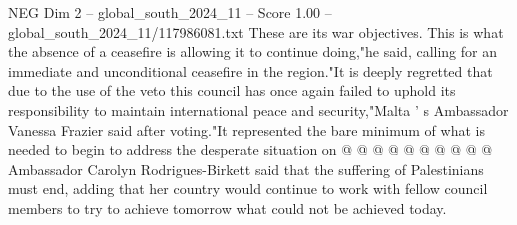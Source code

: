 \begin{textsample}{NEG Dim 2 – global\_south\_2024\_11 – Score 1.00 – global\_south\_2024\_11/117986081.txt}
These are its war objectives.
This is what the absence of a ceasefire is allowing it to continue doing,"he said, calling for an immediate and unconditional ceasefire in the region."It is deeply regretted that due to the use of the veto this council has once again failed to uphold its responsibility to maintain international peace and security,"Malta ' s Ambassador Vanessa Frazier said after voting."It represented the bare minimum of what is needed to begin to address the desperate situation on @ @ @ @ @ @ @ @ @ @ Ambassador Carolyn Rodrigues-Birkett said that the suffering of Palestinians must end, adding that her country would continue to work with fellow council members to try to achieve tomorrow what could not be achieved today.

\end{textsample}
